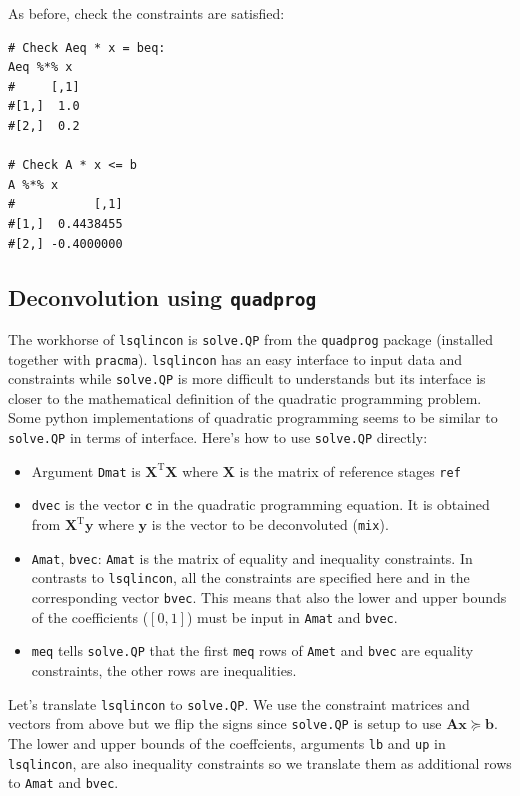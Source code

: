 \documentclass[11pt, fleqn]{article}
\begin{document}
As before, check the constraints are satisfied:

\begin{Verbatim}[formatcom=\color{violet}, fontsize=\small]
# Check Aeq * x = beq:
Aeq %*% x
#     [,1]
#[1,]  1.0
#[2,]  0.2

# Check A * x <= b
A %*% x
#           [,1]
#[1,]  0.4438455
#[2,] -0.4000000

\end{Verbatim}


\subsection{Deconvolution using \texttt{quadprog}}

The workhorse of \texttt{lsqlincon} is \texttt{solve.QP} from the
\texttt{quadprog} package (installed together with \texttt{pracma}).
\texttt{lsqlincon} has an easy interface to input data and constraints while
\texttt{solve.QP} is more difficult to understands but its interface
is closer to the mathematical definition of the quadratic programming problem.
Some python implementations of quadratic programming seems to be similar to
\texttt{solve.QP} in terms of interface. Here's how to use \texttt{solve.QP}
directly:

\begin{itemize}
    \item Argument \texttt{Dmat} is $\mathbf{X}^\mathrm{T}\mathbf{X}$ where
        $\mathbf{X}$ is the matrix of reference stages \texttt{ref}
    \item \texttt{dvec} is the vector $\mathbf{c}$ in the quadratic programming
        equation. It is obtained from $\mathbf{X}^\mathrm{T}\mathbf{y}$ where
        $\mathbf{y}$ is the vector to be deconvoluted (\texttt{mix}).  
    \item \texttt{Amat}, \texttt{bvec}: \texttt{Amat} is the matrix of equality
        and inequality constraints. In contrasts to \texttt{lsqlincon}, all the
        constraints are specified here and in the corresponding vector
        \texttt{bvec}. This means that also the lower and upper bounds of the
        coefficients ($[0, 1]$) must be input in \texttt{Amat} and \texttt{bvec}. 
    \item \texttt{meq} tells \texttt{solve.QP} that the first
        \texttt{meq} rows of \texttt{Amet} and \texttt{bvec} are equality
        constraints, the other rows are inequalities.
\end{itemize}

Let's translate \texttt{lsqlincon} to \texttt{solve.QP}. We use the constraint
matrices and vectors from above but we flip the signs since \texttt{solve.QP}
is setup to use $\mathbf{Ax} \succeq \mathbf{b}$. The lower and upper bounds of
the coeffcients, arguments \texttt{lb} and \texttt{up} in \texttt{lsqlincon},
are also inequality constraints so we translate them as additional rows to
\texttt{Amat} and \texttt{bvec}.
\end{document}
